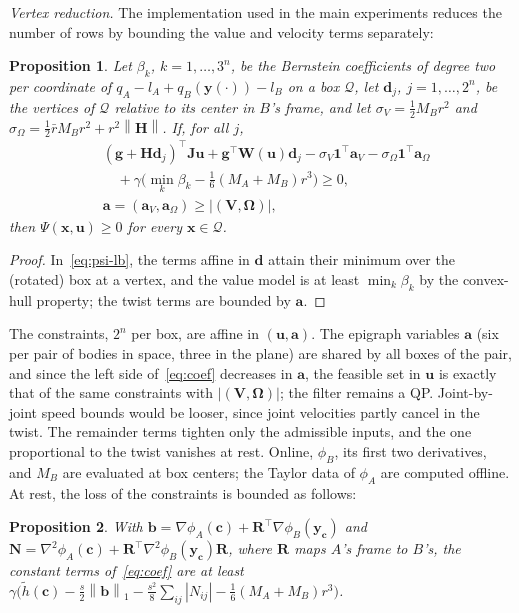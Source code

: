 \documentclass[journal]{IEEEtran}
\newtheorem{proposition}{Proposition}
\theoremstyle{definition}
\newcommand{\norm}[1]{\left\lVert #1\right\rVert}
\newcommand{\Rot}{\mathbf{R}}
\begin{document}
\emph{Vertex reduction.} The implementation used in the main experiments reduces
the number of rows by bounding the value and velocity terms separately:
\begin{proposition}\label{prop:coef}
Let $\beta_k$, $k=1,\dots,3^n$, be the Bernstein coefficients of degree two per coordinate of
$q_A-l_A+q_B(\mathbf y(\cdot))-l_B$ on a box $\mathcal Q$, let $\mathbf d_j$, $j=1,\dots,2^n$, be the
vertices of $\mathcal Q$ relative to its center in $B$'s frame, and let
$\sigma_V=\frac12M_Br^2$ and $\sigma_\Omega=\frac12\bar rM_Br^2+r^2\norm{\mathbf H}$. If, for all $j$,
\begin{equation}\label{eq:coef}
\begin{aligned}
&(\mathbf g+\mathbf H\mathbf d_j)^\top\mathbf J\mathbf u+\mathbf g^\top\mathbf W(\mathbf u)\mathbf d_j
-\sigma_V\mathbf 1^{\!\top}\mathbf a_V-\sigma_\Omega\mathbf 1^{\!\top}\mathbf a_\Omega\\
&\quad+\gamma\big(\min_k\beta_k-\tfrac16(M_A+M_B)r^3\big)\ge0,\\
&\mathbf a=(\mathbf a_V,\mathbf a_\Omega)\ge|(\mathbf V,\boldsymbol\Omega)|,
\end{aligned}
\end{equation}
then $\Psi(\mathbf x,\mathbf u)\ge0$ for every $\mathbf x\in\mathcal Q$.
\end{proposition}
\begin{proof}
In~\eqref{eq:psi-lb}, the terms affine in $\mathbf d$ attain their minimum over the (rotated) box at a
vertex, and the value model is at least $\min_k\beta_k$ by the convex-hull property; the twist terms
are bounded by $\mathbf a$.
\end{proof}
The constraints, $2^n$ per box, are affine in $(\mathbf u,\mathbf a)$. The epigraph variables $\mathbf a$ (six per pair of
bodies in space, three in the plane) are shared by all boxes of the pair, and since the left side
of~\eqref{eq:coef} decreases in $\mathbf a$, the feasible set in $\mathbf u$ is exactly that of the same
constraints with $|(\mathbf V,\boldsymbol\Omega)|$; the filter remains a QP. Joint-by-joint speed bounds
would be looser, since joint velocities partly cancel in the twist.
The remainder terms tighten only the admissible inputs, and the one
proportional to the twist vanishes at rest. Online, $\phi_B$, its first two derivatives, and $M_B$ are
evaluated at box centers; the Taylor data of $\phi_A$ are computed offline. At rest, the loss of the
constraints is bounded as follows:
\begin{proposition}\label{prop:tight}
With $\mathbf b=\nabla\phi_A(\mathbf c)+\Rot^\top\nabla\phi_B(\mathbf y_{\mathbf c})$ and
$\mathbf N=\nabla^2\phi_A(\mathbf c)+\Rot^\top\nabla^2\phi_B(\mathbf y_{\mathbf c})\Rot$, where
$\Rot$ maps $A$'s frame to $B$'s, the constant terms of~\eqref{eq:coef} are at least
$\gamma\big(\tilde h(\mathbf c)-\tfrac s2\norm{\mathbf b}_1-\tfrac{s^2}8\sum_{ij}|N_{ij}|
-\tfrac16(M_A+M_B)r^3\big)$.
\end{proposition}
\end{document}
